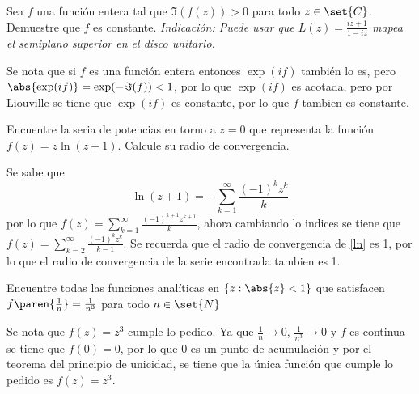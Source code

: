 \documentclass{homework}
\begin{document}
\begin{prob}
    Sea \(f\) una función entera tal que \(\Im(f(z))>0\) para todo \(z\in \set{C}\). Demuestre que \(f\) es constante. \textit{Indicación: Puede usar que \(L(z)=\frac{iz+1}{1-iz}\) mapea el semiplano superior en el disco unitario.}
\end{prob}

\begin{sol}
    Se nota que si \(f\) es una función entera entonces \(\exp(if)\) también lo es, pero \(\abs{\exp(if)}=\exp(-\Im(f))<1\), por lo que \(\exp(if)\) es acotada, pero por Liouville se tiene que \(\exp(if)\) es constante, por lo que \(f\) tambien es constante.
\end{sol}

\begin{prob}
    Encuentre la seria de potencias en torno a \(z=0\) que representa la función \(f(z)=z\ln(z+1)\). Calcule su radio de convergencia.
\end{prob}

\begin{sol}
    Se sabe que
    \begin{equation}
        \ln(z+1)=-\sum_{k=1}^\infty\frac{(-1)^kz^k}k\label{ln}
    \end{equation}
    por lo que \(f(z)=\sum_{k=1}^\infty\frac{(-1)^{k+1}z^{k+1}}k\), ahora cambiando lo indices se tiene que \(f(z)=\sum_{k=2}^\infty\frac{(-1)^kz^k}{k-1}\). Se recuerda que el radio de convergencia de \eqref{ln} es 1, por lo que el radio de convergencia de la serie encontrada tambien es 1.
\end{sol}

\begin{prob}
    Encuentre todas las funciones analíticas en \(\{z:\abs{z}<1\}\) que satisfacen \(f\paren{\frac1n}=\frac1{n^3}\) para todo \(n\in\set{N}\)
\end{prob}

\begin{sol}
    Se nota que \(f(z)=z^3\) cumple lo pedido. Ya que \(\frac1n\rightarrow 0\), \(\frac1{n^3}\rightarrow 0\) y \(f\) es continua se tiene que \(f(0)=0\), por lo que \(0\) es un punto de acumulación y por el teorema del principio de unicidad, se tiene que la única función que cumple lo pedido es \(f(z)=z^3\).
\end{sol}
\end{document}
